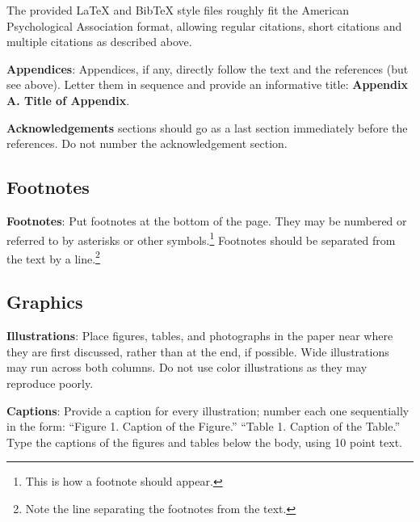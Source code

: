 \documentclass[10pt]{article}
\begin{document}
The provided \LaTeX{} and Bib\TeX{} style files roughly fit the
American Psychological Association format, allowing regular citations, 
short citations and multiple citations as described above.

{\bf Appendices}: Appendices, if any, directly follow the text and the
references (but see above).  Letter them in sequence and provide an
informative title: {\bf Appendix A. Title of Appendix}.

\textbf{Acknowledgements} sections should go as a last section immediately
before the references.  Do not number the acknowledgement section.

\subsection{Footnotes}

{\bf Footnotes}: Put footnotes at the bottom of the page. They may
be numbered or referred to by asterisks or other
symbols.\footnote{This is how a footnote should appear.} Footnotes
should be separated from the text by a line.\footnote{Note the
line separating the footnotes from the text.}

\subsection{Graphics}

{\bf Illustrations}: Place figures, tables, and photographs in the
paper near where they are first discussed, rather than at the end, if
possible.  Wide illustrations may run across both columns. Do not use
color illustrations as they may reproduce poorly.

{\bf Captions}: Provide a caption for every illustration; number each one
sequentially in the form:  ``Figure 1. Caption of the Figure.'' ``Table 1.
Caption of the Table.''  Type the captions of the figures and 
tables below the body, using 10 point text.  




%
%
\end{document}
